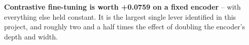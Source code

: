 \textbf{Contrastive fine-tuning is worth +0.0759 on a fixed encoder} -- with everything else held constant. It is the largest single lever identified in this project, and roughly two and a half times the effect of doubling the encoder's depth and width.









